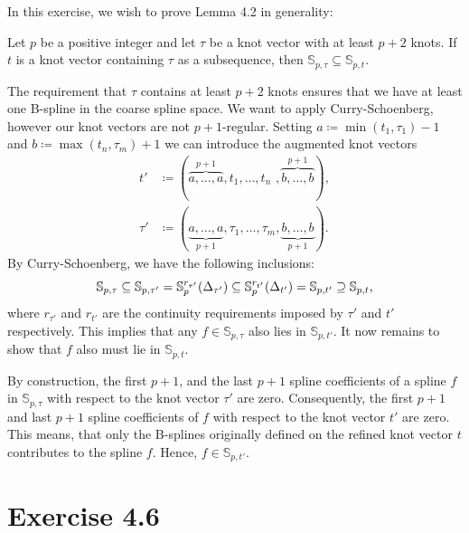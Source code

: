\documentclass{article}
\renewcommand{\S}{\mathbb{S}}
\begin{document}
    In this exercise, we wish to prove Lemma 4.2 in generality:
    \begin{lemma}[4.2]
        Let $p$ be a positive integer and let $\tau$ be a knot vector with at
        least $p+2$ knots. If $t$ is a knot vector containing $\tau$ as a
        subsequence, then $\S_{p, \tau} \subseteq \S_{p, t}$.
    \end{lemma}
    The requirement that $\tau$ contains at least $p + 2$ knots ensures that we
    have at least one B-spline in the coarse spline space.  We want to apply
    Curry-Schoenberg, however our knot vectors are not $p+1$-regular. Setting
    $a \coloneqq \min(t_1, \tau_1) - 1$ and $b \coloneqq \max(t_n, \tau_m) + 1$
    we can introduce the augmented knot vectors
    \begin{align*}
        t' &\coloneqq (\overbrace{a, \ldots, a}^{p+1}, t_1, \ldots, t_n\,\,,
        \overbrace{b, \ldots, b}^{p+1}), \\ \tau' &\coloneqq (\underbrace{a,
    \ldots, a}_{p+1}, \tau_1, \ldots, \tau_m, \underbrace{b, \ldots, b}_{p+1}).
    \end{align*}
    By Curry-Schoenberg, we have the following inclusions:
    \begin{equation}
        \notag
        \S_{p, \tau} \subseteq \S_{p, \tau'} = \S_p^{r_{\tau'}}(\Delta_{\tau'}) \subseteq
        \S_p^{r_{t'}}(\Delta_{t'}) = \S_{p, t'} \supseteq \S_{p, t}, 
    \end{equation}
    where $r_{\tau'}$ and $r_{t'}$ are the continuity requirements imposed by
    $\tau'$ and $t'$ respectively.  This implies that any $f \in \S_{p, \tau}$
    also lies in $\S_{p, t'}$. It now remains to show that $f$ also must lie in
    $\S_{p, t}$.

    By construction, the first $p+1$, and the last $p+1$ spline coefficients of
    a spline $f$ in $\S_{p, \tau}$ with respect to the knot vector $\tau'$ are
    zero. Consequently, the first $p+1$ and last $p+1$ spline coefficients of
    $f$ with respect to the knot vector $t'$ are zero. This means, that only
    the B-splines originally defined on the refined knot vector $t$ contributes
    to the spline $f$. Hence, $f \in \S_{p, t'}$.
    
    \section*{Exercise 4.6}
    
\end{document}
